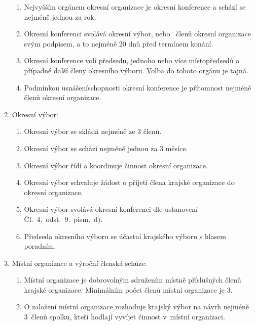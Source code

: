 \documentclass[a4paper]{article}
\begin{document}
\begin{enumerate}
\begin{enumerate}
        \item Nejvyšším orgánem okresní organizace je okresní konference a
            schází se nejméně jednou za rok.

        \item Okresní konferenci svolává okresní výbor,
            nebo ~členů okresní organizace svým podpisem, a to
            nejméně 20 dnů před termínem konání.

        \item Okresní konference volí předsedu, jednoho nebo více místopředsedů a případné další členy
            okresního výboru.
            Volba do tohoto orgánu je tajná.

        \item Podmínkou usnášeníschopnosti okresní konference
            je přítomnost nejméně  členů okresní organizace.
        \end{enumerate}

    \item Okresní výbor:
        \begin{enumerate}
        \item Okresní výbor se skládá nejméně ze 3 členů.

        \item Okresní výbor se schází nejméně jednou za 3 měsíce.

        \item Okresní výbor řídí a koordinuje činnost okresní organizace.

        \item Okresní výbor schvaluje žádost o přijetí člena krajské organizace do okresní organizace.

        \item Okresní výbor svolává okresní konferenci dle ustanovení Čl.~4.~odst.~9.~písm.~d).

        \item Předseda okresního výboru se účastní krajského výboru s hlasem poradním.
        \end{enumerate}

    \item Místní organizace a výroční členská schůze:
        \begin{enumerate}
        \item Místní organizace je dobrovolným sdružením místně příslušných
            členů krajské organizace. Minimálním počet členů místní organizace
            je 3.

        \item O založení místní organizace rozhoduje krajský výbor na
            návrh nejméně 3~členů spolku, kteří hodlají vyvíjet činnost
            v~místní organizaci.


\end{enumerate}
\end{enumerate}
\end{document}
